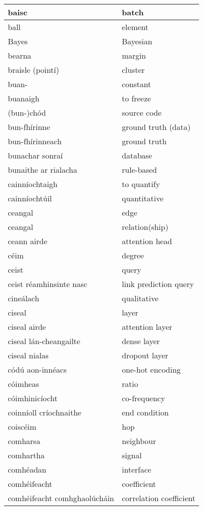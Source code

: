 \begin{longtable}{|l|l|}
		baisc&batch\\ \hline 
		ball&element\\ \hline 
		Bayes&Bayesian\\ \hline 
		bearna&margin\\ \hline 
		braisle (pointí)&cluster\\ \hline 
		buan-&constant\\ \hline 
		buanaigh&to freeze\\ \hline 
		(bun-)chód&source code\\ \hline 
		bun-fhírinne&ground truth (data)\\ \hline 
		bun-fhírinneach&ground truth\\ \hline 
		bunachar sonraí&database\\ \hline 
		bunaithe ar rialacha&rule-based\\ \hline 
		cainníochtaigh&to quantify\\ \hline 
		cainníochtúil&quantitative\\ \hline 
		ceangal&edge\\ \hline 
		ceangal&relation(ship)\\ \hline 
		ceann airde&attention head\\ \hline 
		céim&degree\\ \hline 
		ceist&query\\ \hline 
		ceist réamhinsinte nasc&link prediction query\\ \hline 
		cineálach&qualitative\\ \hline 
		ciseal&layer\\ \hline 
		ciseal airde&attention layer\\ \hline 
		ciseal lán-cheangailte&dense layer\\ \hline 
		ciseal nialas&dropout layer\\ \hline 
		códú aon-innéacs&one-hot encoding\\ \hline 
		cóimheas&ratio\\ \hline 
		cóimhinicíocht&co-frequency\\ \hline 
		coinníoll críochnaithe&end condition\\ \hline 
		coiscéim&hop\\ \hline 
		comharsa&neighbour\\ \hline 
		comhartha&signal\\ \hline 
		comhéadan&interface\\ \hline 
		comhéifeacht&coefficient\\ \hline 
		comhéifeacht comhghaolúcháin&correlation coefficient\\ \hline 

\end{longtable}
